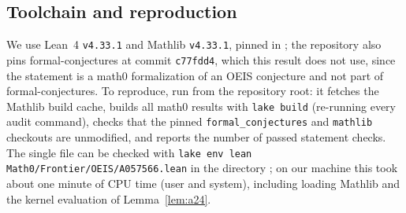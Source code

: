 \documentclass[11pt]{amsart}
\theoremstyle{plain}
\theoremstyle{definition}
\begin{document}
\subsection*{Toolchain and reproduction}
We use Lean~4 \cite{Lean4} \texttt{v4.33.1} and Mathlib \cite{Mathlib} \texttt{v4.33.1}, pinned in ; the repository also pins formal-conjectures \cite{FC} at commit \texttt{c77fdd4}, which this result does not use, since the statement is a math0 formalization of an OEIS conjecture and not part of formal-conjectures.
To reproduce, run  from the repository root: it fetches the Mathlib build cache, builds all math0 results with \texttt{lake build} (re-running every audit command), checks that the pinned \texttt{formal\_conjectures} and \texttt{mathlib} checkouts are unmodified, and reports the number of passed statement checks. The single file can be checked with \texttt{lake env lean Math0/Frontier/OEIS/A057566.lean} in the directory ; on our machine this took about one minute of CPU time (user and system), including loading Mathlib and the kernel evaluation of Lemma~\ref{lem:a24}.
\end{document}
